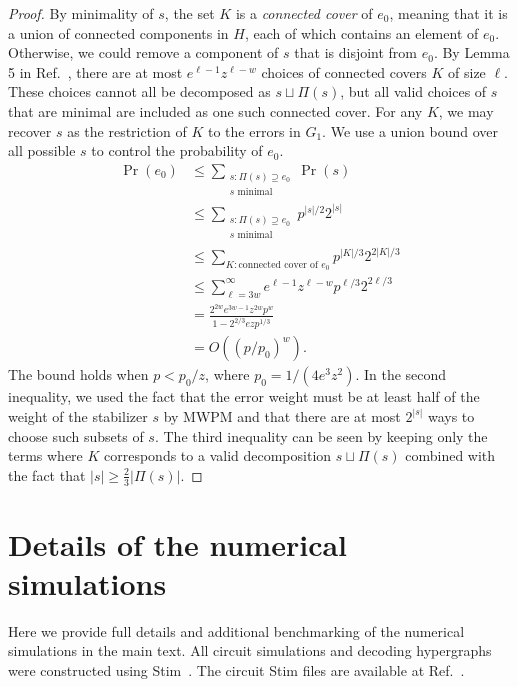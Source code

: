 \documentclass[prx,twocolumn,secnumarabic,balancelastpage,amsmath,amssymb,longbibliography]{revtex4-2}
\begin{document}
\begin{proof}
By minimality of $s$, the set $K$ is a \emph{connected cover} of $e_0$, meaning that it is a union of connected components in $H$, each of which contains an element of $e_0$. 
%
Otherwise, we could remove a component of $s$ that is disjoint from $e_0$. By Lemma 5 in Ref.~\cite{aliferis2007accuracy}, there are at most $e^{\ell - 1}z^{\ell - w}$ choices of connected covers $K$ of size $\ell$. 
%
These choices cannot all be decomposed as $s\sqcup \Pi(s)$, but all valid choices of $s$ that are minimal are included as one such connected cover.
%
For any $K$, we may recover $s$ as the restriction of $K$ to the errors in $G_1$. We use a union bound over all possible $s$ to control the probability of $e_0$.
\begin{align}
    \Pr(e_0) &\le \sum_{\substack{s: \Pi(s)\supseteq e_0\\s \text{ minimal}}}\Pr(s) \nonumber\\
    &\le \sum_{\substack{s: \Pi(s)\supseteq e_0\\s \text{ minimal}}} p^{|s|/2}2^{|s|} \nonumber\\
    &\le \sum_{K: \text{connected cover of } e_0}p^{|K|/3}2^{2|K|/3} \nonumber\\
    &\le \sum_{\ell=3w}^\infty e^{\ell-1}z^{\ell-w}p^{\ell/3}2^{2\ell/3} \nonumber\\
    &= \frac{2^{2w}e^{3w-1}z^{2w}p^w}{1 - 2^{2/3}ezp^{1/3}} \nonumber\\
    &= O\left((p/p_0)^w\right).
    \end{align}
The bound holds when $p < p_0/z$, where $p_0 = 1/(4e^3z^2)$. 
%
In the second inequality, we used the fact that the error weight must be at least half of the weight of the stabilizer $s$ by MWPM and that there are at most $2^{|s|}$ ways to choose such subsets of $s$. 
%
The third inequality can be seen by keeping only the terms where $K$ corresponds to a valid decomposition $s\sqcup \Pi(s)$ combined with the fact that $|s| \ge \frac 2 3 |\Pi(s)|$.
\end{proof}

\section{Details of the numerical simulations\label{appendix:numerics}}
Here we provide full details and additional benchmarking of the numerical simulations in the main text.
%
All circuit simulations and decoding hypergraphs were constructed using Stim~\cite{gidney2021stim}.
%
The circuit Stim files are available at Ref.~\cite{cain2025zenodo}.
\end{document}
